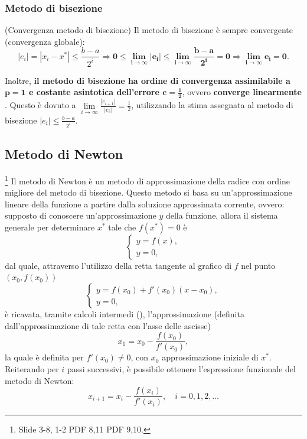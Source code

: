 \subsubsection{Metodo di bisezione}\label{ssec:convergenza_metodo_bisezione}
\begin{remark}(Convergenza metodo di bisezione)
	Il metodo di bisezione è sempre convergente (convergenza globale): 
	\begin{equation*}
		|e_i|=|x_i-x^*|\leq \frac{b-a}{2^i}\Rightarrow \boldsymbol{0\leq \lim_{i\to\infty}|e_i|\leq \lim_{i\to\infty}{\frac{b-a}{2^i}=0}\Rightarrow \lim_{i\to\infty}{e_i}=0.}
	\end{equation*}
\end{remark}

\noindent Inoltre, \textbf{il metodo di bisezione ha ordine di convergenza assimilabile a $\boldsymbol{p=1}$ e costante asintotica dell'errore $\boldsymbol{c=\frac{1}{2}}$}, ovvero \textbf{converge linearmente} \footnotemark. Questo è dovuto a $\underset{{i\to\infty}}{\lim}{\frac{|e_{i+1}|}{|e_i|}}=\frac{1}{2}$, utilizzando la stima assegnata al metodo di bisezione $|e_i|\leq\frac{b-a}{2^i}$.


\subsection{Metodo di Newton}
\footnote{Slide 3-8, 1-2 PDF 8,11 PDF 9,10.}
Il metodo di Newton è un metodo di approssimazione della radice con ordine migliore del metodo di bisezione. Questo metodo si basa su un'approssimazione lineare della funzione a partire dalla soluzione approssimata corrente, ovvero: supposto di conoscere un'approssimazione $y$ della funzione, allora il sistema generale per determinare $x^*$ tale che $f(x^*)=0$ è
\begin{equation*}
	\begin{cases}
		y = f(x),\\
		y = 0,
	\end{cases}
\end{equation*}
dal quale, attraverso l'utilizzo della retta tangente al grafico di $f$ nel punto $(x_0,f(x_0))$
\begin{equation}\label{eq:retta_tangente_in_0}
	\begin{cases}
		y = f(x_0) + f'(x_0)(x-x_0), \\
		y = 0,
	\end{cases}
\end{equation}
è ricavata, tramite calcoli intermedi (\footnotemark), l'approssimazione (definita dall'approssimazione di tale retta con l'asse delle ascisse)
\begin{equation*}
	x_1=x_0-\frac{f(x_0)}{f'(x_0)},
\end{equation*}
la quale è definita per $f'(x_0)\neq 0$, con $x_0$ approssimazione iniziale di $x^*$. Reiterando per $i$ passi successivi, è possibile ottenere l'espressione funzionale del metodo di Newton:
\begin{equation}\label{eq:approxNewton}
	x_{i+1}=x_i-\frac{f(x_i)}{f'(x_i)}, \quad i=0,1,2,\hdots
\end{equation}

